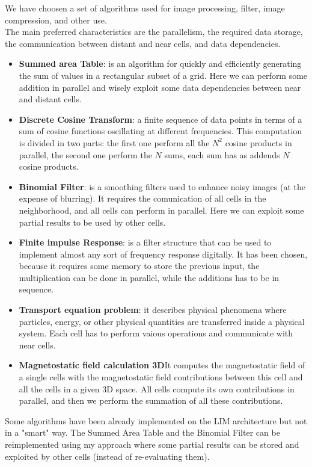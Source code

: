 \documentclass[12pt]{report}
\begin{document}
	
	We have choosen a set of algorithms used for image processing, filter, image compression, and other use.\\
	The main preferred characteristics are the parallelism, the required data storage, the communication between distant and near cells, and data dependencies.
	\begin{itemize}
		\item \textbf{Summed area Table}: is an algorithm for quickly and efficiently generating the sum of values in a rectangular subset of a grid. Here we can perform some addition in parallel and wisely exploit some data dependencies between near and distant cells.
		\item \textbf{Discrete Cosine Transform}: a finite sequence of data points in terms of a sum of cosine functions oscillating at different frequencies. This computation is divided in two parts: the first one perform all the $ N^2 $ cosine products in parallel, the second one perform the $N $ sums, each sum has as addends $N$ cosine products.
		\item \textbf{Binomial Filter}: is a smoothing filters used to enhance noisy images (at the expense of blurring). It requires the comunication of all cells in the neighborhood, and all cells can perform in parallel. Here we can exploit some partial results to be used by other cells.
		\item \textbf{Finite impulse Response}: is a filter structure that can be used to implement almost any sort of frequency response digitally. It has been chosen, because it requires some memory to store the previous input, the multiplication can be done in parallel, while the additions has to be in sequence.
		\item \textbf{Transport equation problem}: it describes physical phenomena where particles, energy, or other physical quantities are transferred inside a physical system. Each cell has to perform vaious operations and communicate with near cells.
		\item \textbf{Magnetostatic field calculation 3D}It computes the magnetostatic field of a single cells with the magnetostatic field contributions between this cell and all the cells in a given 3D space.	All cells compute its own contributions in parallel, and then we perform the summation of all these contributions.		\end{itemize}
	
	Some algorithms have been already implemented on the LIM architecture but not in a "smart" way. The Summed Area Table and the Binomial Filter can be reimplemented using my approach where some partial results can be stored and exploited by other cells (instead of re-evaluating them).		
\vspace{1cm}
\end{document}

